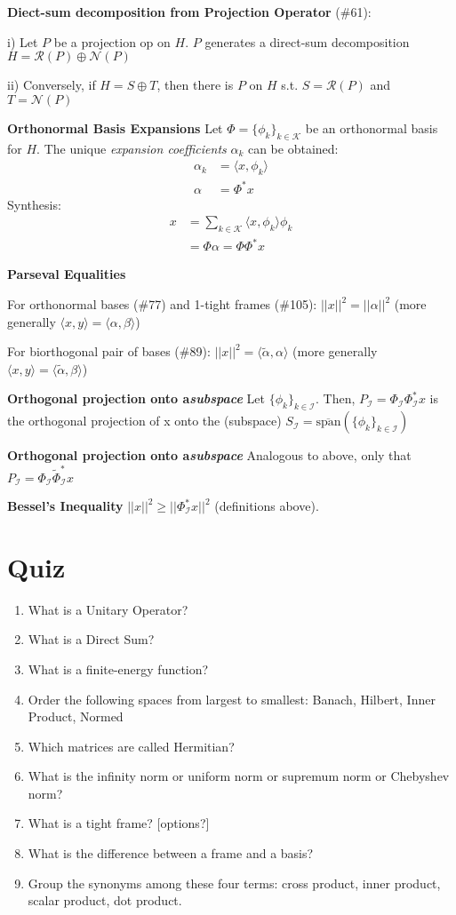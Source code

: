 \documentclass{article}
\newcommand{\la}{\langle}
\newcommand{\ra}{\rangle}
\begin{document}
\textbf{Diect-sum decomposition from Projection Operator} (\#61):

i) Let $P$ be a projection op on $H$. $P$ generates a direct-sum decomposition $H=\mathcal{R}(P)\oplus\mathcal{N}(P)$

ii) Conversely, if $H=S\oplus T$, then there is $P$ on $H$ s.t. $S=\mathcal{R}(P)$ and $T=\mathcal{N}(P)$

\textbf{Orthonormal Basis Expansions} Let $\Phi=\{\phi_k\}_{k\in\mathcal{K}}$ be an orthonormal basis for $H$. The unique \textit{expansion coefficients} $\alpha_k$ can be obtained: 
\begin{eqnarray}
\alpha_k &= \la x, \phi_k \ra \\
\alpha &= \Phi^{*} x
\end{eqnarray}
Synthesis:
\begin{eqnarray}
x &= \sum_{k\in\mathcal{K}}\la x, \phi_k\ra \phi_k \\
&= \Phi\alpha = \Phi\Phi^{*}x
\end{eqnarray}


\textbf{Parseval Equalities} 

For orthonormal bases (\#77) and 1-tight frames (\#105): $||x||^2=||\alpha||^2$ (more generally $\la x,y \ra = \la \alpha, \beta \ra$)

For biorthogonal pair of bases (\#89): $||x||^2=\la \tilde{\alpha}, \alpha\ra$ (more generally $\la x,y \ra = \la \tilde{\alpha}, \beta \ra$)

\textbf{Orthogonal projection onto a\textit{subspace}}
Let $\{\phi_k\}_{k\in\mathcal{I}}$. Then, $P_{\mathcal{I}}=\Phi_{\mathcal{I}}\Phi_{\mathcal{I}}^{*}x$ is the orthogonal projection of x onto the (subspace) $S_{\mathcal{I}}=\overline{\mbox{span}}(\{\phi_k\}_{k\in\mathcal{I}})$

\textbf{Orthogonal projection onto a\textit{subspace}}
Analogous to above, only that $P_{\mathcal{I}}=\Phi_{\mathcal{I}}\tilde{\Phi}_{\mathcal{I}}^{*}x$

\textbf{Bessel's Inequality} $||x||^2\ge ||\Phi_{\mathcal{I}}^{*}x||^2$ (definitions above).
\clearpage
\section*{Quiz}
\begin{enumerate}
\bf
\item What is a Unitary Operator?
\item What is a Direct Sum?
\item What is a finite-energy function?
\item Order the following spaces from largest to smallest: Banach, Hilbert, Inner Product, Normed
\item Which matrices are called Hermitian?
\item What is the infinity norm or uniform norm or supremum norm or Chebyshev norm?
\item What is a tight frame? [options?]
\item What is the difference between a frame and a basis?
\item Group the synonyms among these four terms: cross product, inner product, scalar product, dot product.
\end{enumerate}

\end{document}
